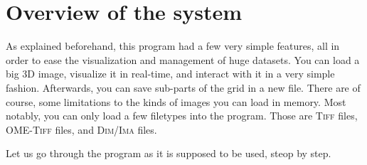 \section{Overview of the system}\label{text:02_program_flow:01_overview}
{

	As explained beforehand, this program had a few very simple features, all in order to ease the visualization and management of huge datasets. You can load a big 3D image, visualize it in real-time, and interact with it in a very simple fashion. Afterwards, you can save sub-parts of the grid in a new file. There are of course, some limitations to the kinds of images you can load in memory. Most notably, you can only load a few filetypes into the program. Those are \textsc{Tiff} files, \textsc{OME-Tiff} files, and \textsc{Dim/Ima} files.\par
	Let us go through the program as it is supposed to be used, steop by step.\par\myparspace

}
